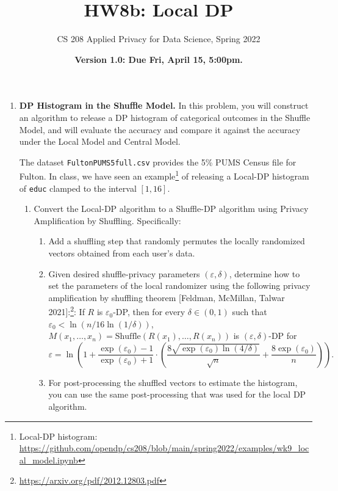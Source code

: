 \documentclass[11pt]{article}
\title{\vspace{-1.5cm} HW8b: Local DP}
\author{CS 208 Applied Privacy for Data Science, Spring 2022}
\date{\textbf{Version 1.0: Due Fri, April 15, 5:00pm.}}
\begin{document}
\maketitle

\begin{enumerate}[leftmargin=*]


\item \textbf{DP Histogram in the Shuffle Model.} In this problem, you will construct an algorithm to release a DP histogram of categorical outcomes in the Shuffle Model, and will evaluate the accuracy and compare it against the accuracy under the Local Model and Central Model. 

The dataset 
\texttt{FultonPUMS5full.csv}
provides the 5\% PUMS Census file for 
Fulton. In class, we have seen an example\footnote{Local-DP histogram: \url{https://github.com/opendp/cs208/blob/main/spring2022/examples/wk9_local_model.ipynb}} 
of releasing a Local-DP histogram of \texttt{educ} clamped to the interval $[1,16]$.  

\begin{enumerate}
\item 
Convert the Local-DP algorithm to a Shuffle-DP algorithm using Privacy Amplification by Shuffling.  Specifically:

\begin{enumerate}
    \item Add a shuffling step that randomly permutes the locally randomized vectors obtained from each user's data.
    
    \item Given desired shuffle-privacy parameters $(\varepsilon,\delta)$, determine how to set the parameters of the local randomizer using the following privacy amplification by shuffling theorem [Feldman, McMillan, Talwar 2021]:\footnote{\url{https://arxiv.org/pdf/2012.12803.pdf}}:  If $R$ is $\varepsilon_0$-DP, then for every $\delta\in (0,1)$ such that $\varepsilon_0<\ln (n/16\ln(1/\delta))$,
    $M(x_1,\ldots,x_n) = \mathrm{Shuffle}(R(x_1),\ldots,R(x_n))$ is $(\varepsilon,\delta)$-DP for 
$$\varepsilon = \ln\left(1+\frac{\exp(\varepsilon_0)-1}{\exp(\varepsilon_0)+1}\cdot\left(\frac{8\sqrt{\exp(\varepsilon_0)\ln(4/\delta)}}{\sqrt{n}}+\frac{8\exp(\varepsilon_0)}{n}\right)\right).$$

    \item For post-processing the shuffled vectors to estimate the histogram, you can use the same post-processing that was used for the local DP algorithm.
    
\end{enumerate}


\end{enumerate}
\end{enumerate}
\end{document}
